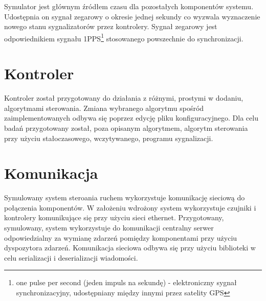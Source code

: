 Symulator jest głównym źródłem czasu dla pozostałych komponentów systemu. Udostępnia on sygnał zegarowy o okresie jednej sekundy co wyzwala wyznaczenie nowego stanu sygnalizatorów przez kontrolery. Sygnał zegarowy jest odpowiednikiem sygnału 1PPS\footnote{one pulse per second (jeden impuls na sekundę) - elektroniczny sygnał synchronizacyjny, udostępniany między innymi przez satelity GPS} stosowanego powszechnie do synchronizacji.

\section{Kontroler}
\label{chap:kontroler}
Kontroler został przygotowany do działania z różnymi, prostymi w dodaniu, algorytmami sterowania. Zmiana wybranego algorytmu spośród zaimplementowanych odbywa się poprzez edycję pliku konfiguracyjnego. Dla celu badań przygotowany został, poza opisanym algorytmem, algorytm sterowania przy użyciu stałoczasowego, wczytywanego, programu sygnalizacji.

\section{Komunikacja}
\label{chap:komunikacja}
Symulowany system steroania ruchem wykorzystuje komunikację sieciową do połączenia komponentów. W założeniu wdrożony system wykorzystuje czujniki i kontrolery komunikujące się przy użyciu sieci ethernet. Przygotowany, symulowany, system wykorzystuje do komunikacji centralny serwer odpowiedzialny za wymianę zdarzeń pomiędzy komponentami przy użyciu dyspozytora zdarzeń. Komunikacja sieciowa odbywa się przy użyciu biblioteki \cite{protobuf} w celu serializacji i deserializacji wiadomości.